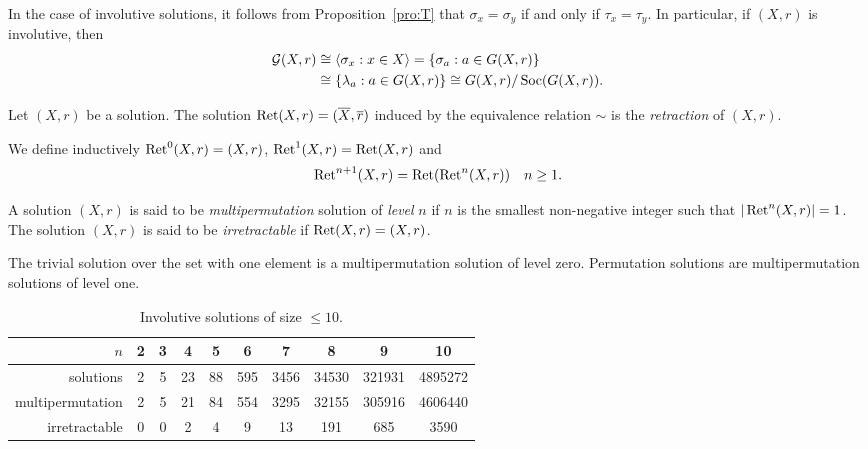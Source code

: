 In the case of involutive solutions, it follows from Proposition~\ref{pro:T} 
that $\sigma_x=\sigma_y$ if and only if $\tau_x=\tau_y$. In particular, if $(X,r)$ is involutive, then
\begin{align*}\mathcal{G}(X,r) &\cong\langle \sigma_x : x\in X\rangle=\{ \sigma_a : a\in G(X,r)\}\\
&\cong\{ \lambda_a : a\in G(X,r)\}\cong G(X,r)/\operatorname{Soc}(G(X,r)).
\end{align*}

\begin{definition}
Let $(X,r)$ be a solution. The solution $\operatorname{Ret}(X,r)=(\overline{X},\overline{r})$ induced
by the equivalence relation $\sim$ is the \emph{retraction} of $(X,r)$.
\end{definition}

We define inductively $\operatorname{Ret}^0(X,r)=(X,r)$, $\operatorname{Ret}^1(X,r)=\operatorname{Ret}(X,r)$ and
\[
\operatorname{Ret}^{n+1}(X,r)=\operatorname{Ret}(\operatorname{Ret}^n(X,r))\quad n\geq1.
\]


\begin{definition}
    A solution $(X,r)$ is said to be {\em multipermutation} solution of \emph{level} $n$ 
    if $n$ is the smallest non-negative integer 
    such that $|\operatorname{Ret}^n(X,r)|=1$. The solution $(X,r)$ is said to be 
    \emph{irretractable} if $\operatorname{Ret}(X,r)=(X,r)$. 
\end{definition}

The trivial solution over the set with one element is a multipermutation solution of level zero. 
Permutation solutions are multipermutation solutions of level one. 

\begin{example}

\end{example}

\begin{example}

\end{example}

\begin{table}[H]
\centering
\caption{Involutive solutions of size $\leq10$.}
\begin{tabular}{|r|ccccccccc|}
\hline
$n$ & 2 & 3 & 4 & 5 & 6 & 7 & 8 & 9 & 10\tabularnewline
\hline 
solutions & 2 & 5 & 23 & 88 & 595 & 3456 & 34530 & 321931 & 4895272\tabularnewline
multipermutation & 2 & 5 & 21 & 84 & 554 & 3295 & 32155 & 305916 & 4606440\tabularnewline
irretractable & 0 & 0 & 2 & 4 & 9 & 13 & 191 & 685 & 3590\tabularnewline
\hline
\end{tabular}
\label{tab:INV_mp}
\end{table}


